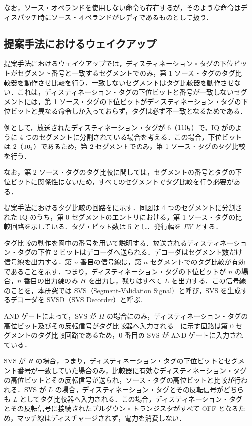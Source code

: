 なお，ソース・オペランドを使用しない命令も存在するが，そのような命令はディスパッチ時にソース・オペランドがレディであるものとして扱う．


\subsection{提案手法におけるウェイクアップ}
提案手法におけるウェイクアップでは，ディスティネーション・タグの下位ビットがセグメント番号と一致するセグメントでのみ，第 1 ソース・タグのタグ比較器を動作させ比較を行う．一致しないセグメントはタグ比較器を動作させない．これは，ディスティネーション・タグの下位ビットと番号が一致しないセグメントには，第 1 ソース・タグの下位ビットがディスティネーション・タグの下位ビットと異なる命令しか入っておらず，タグは必ず不一致となるためである．

例として，放送されたディスティネーション・タグが 6（${\rm 110_2}$）で，IQ がのように 4 つのセグメントに分割されている場合を考える．この場合，下位ビットは 2（${\rm 10_2}$）であるため，第 2 セグメントでのみ，第 1 ソース・タグのタグ比較を行う．

なお，第 2 ソース・タグのタグ比較に関しては，セグメントの番号とタグの下位ビットに関係性はないため，すべてのセグメントでタグ比較を行う必要がある．

提案手法におけるタグ比較の回路をに示す．同図は 4 つのセグメントに分割された IQ のうち，第 0 セグメントのエントリにおける，第 1 ソース・タグの比較回路を示している．タグ・ビット数は 5 とし、発行幅を $IW$ とする．

タグ比較の動作を図中の番号を用いて説明する．放送されるディスティネーション・タグの下位 2 ビットはデコーダへ送られる．デコーダはセグメント数だけ信号線を出力する．第 $n$ 番目の信号線は，第 $n$ セグメントでのタグ比較が有効であることを示す．つまり，ディスティネーション・タグの下位ビットが $n$ の場合，$n$ 番目の出力線のみ $H$ を出力し，残りはすべて $L$ を出力する．この信号線のことを，本研究では SVS（Segment-Validation Signal）と呼び，SVS を生成するデコーダを SVSD（SVS Decorder）と呼ぶ．

AND ゲートによって，SVS が $H$ の場合にのみ，ディスティネーション・タグの高位ビット及びその反転信号がタグ比較器へ入力される．に示す回路は第 0 セグメントのタグ比較回路であるため，0 番目の SVS が AND ゲートに入力されている．

SVS が $H$ の場合，つまり，ディスティネーション・タグの下位ビットとセグメント番号が一致していた場合のみ，比較器に有効なディスティネーション・タグの高位ビットとその反転信号が送られ，ソース・タグの高位ビットと比較が行われる．SVS が $L$ の場合，ディスティネーション・タグとその反転信号がどちらも $L$ としてタグ比較器へ入力される．この場合，ディスティネーション・タグとその反転信号に接続されたプルダウン・トランジスタがすべて OFF となるため，マッチ線はディスチャージされず，電力を消費しない．

